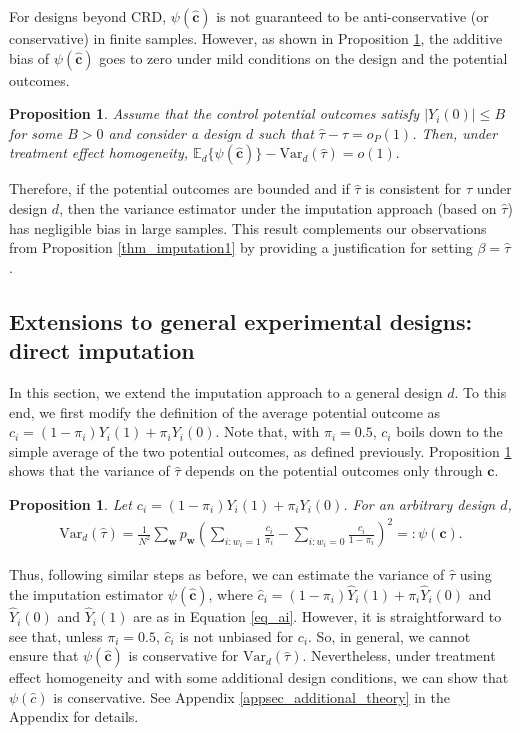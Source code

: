 \documentclass[12pt]{article}
\newcommand{\Var}{{\text{Var}}}
\newcommand{\E}{{\mathbb{E}}}
\newtheorem{proposition}[theorem]{Proposition}
\begin{document}
For designs beyond CRD, $\psi(\hat{\bm{c}})$ is not guaranteed to be anti-conservative (or conservative) in finite samples. However, as shown in Proposition \ref{prop_imp_tauhat_asymp}, the additive bias of $\psi(\hat{\bm{c}})$ goes to zero under mild conditions on the design and the potential outcomes.
\begin{proposition} \normalfont
Assume that the control potential outcomes satisfy $|Y_i(0)|\leq B$ for some $B>0$ and consider a design $d$ such that $\hat{\tau} - \tau = o_P(1)$. Then, under treatment effect homogeneity, $\E_d\{\psi(\hat{\bm{c}})\} - \Var_d(\hat{\tau}) = o(1).$
    \label{prop_imp_tauhat_asymp}
\end{proposition}
Therefore, if the potential outcomes are bounded and if $\hat{\tau}$ is consistent for $\tau$ under design $d$, then the variance estimator under the imputation approach (based on $\hat{\tau}$) has negligible bias in large samples. This result complements our observations from Proposition \ref{thm_imputation1} by providing a justification for setting $\beta = \hat{\tau}$.


\subsection{Extensions to general experimental designs: direct imputation}
\label{sec_imputation_extension}

In this section, we extend the imputation approach to a general design $d$. To this end, we first modify the definition of the average potential outcome as $c_i  = (1-\pi_i)Y_i(1) + \pi_i Y_i(0)$. Note that, with $\pi_i = 0.5$, $c_i$ boils down to the simple average of the two potential outcomes, as defined previously. Proposition \ref{prop_impute_gen} shows that the variance of $\hat{\tau}$ depends on the potential outcomes only through $\bm{c}$. 
\begin{proposition} \normalfont
Let $c_i  = (1-\pi_i)Y_i(1) + \pi_i Y_i(0)$. For an arbitrary design $d$,
    \begin{align}
    \Var_d(\hat{\tau}) = \frac{1}{N^2}\sum_{\bm{w}} p_{\bm{w}} \left(\sum_{i:w_{i} = 1}\frac{c_{i}}{\pi_{i}} - \sum_{i:w_{i} = 0}\frac{c_{i}}{1-\pi_{i}} \right)^2 =: \psi(\bm{c}). 
\end{align}
\label{prop_impute_gen}
\end{proposition}
Thus, following similar steps as before, we can estimate the variance of $\hat{\tau}$ using the imputation estimator $\psi(\hat{\bm{c}})$, where $\hat{c}_i  = (1-\pi_i)\hat{Y}_i(1) + \pi_i \hat{Y}_i(0)$ and $\hat{Y}_i(0)$ and $\hat{Y}_i(1)$ are as in Equation \ref{eq_ai}. However, it is straightforward to see that, unless $\pi_i = 0.5$, $\hat{c}_i$ is not unbiased for $c_i$. So, in general, we cannot ensure that $\psi(\hat{\bm{c}})$ is conservative for $\Var_d(\hat{\tau})$.
Nevertheless, under treatment effect homogeneity and with some additional design conditions, we can show that $\psi(\hat{c})$ is conservative. See Appendix \ref{appsec_additional_theory} in the Appendix for details.
\end{document}
